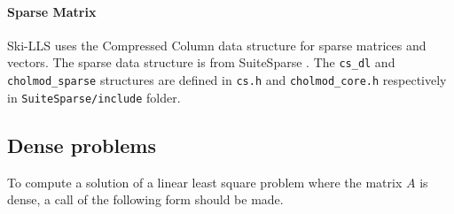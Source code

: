 \documentclass[english,11pt]{article}
\begin{document}
\paragraph{Sparse Matrix}
Ski-LLS uses the Compressed Column data structure for sparse matrices and vectors. The sparse data structure is from SuiteSparse \cite{Davis:2011ft}. The {\tt cs_dl} and {\tt cholmod_sparse} structures are defined in {\tt cs.h} and {\tt cholmod_core.h} respectively in {\tt SuiteSparse/include} folder. 



\subsection{Dense problems}

To compute a solution of a linear least square problem where the matrix $A$ is dense, a call of the following form should be made. \\
\end{document}
